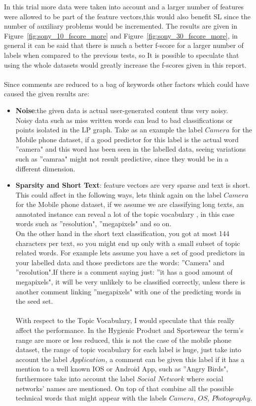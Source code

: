 \documentclass[4pt,a4paper,twocolumn]{article}
\begin{document}
In this trial more data were taken into account and a larger number of features were allowed to be part of the feature vectors,this would also benefit SL since the number of auxiliary problems would be incremented.
The results are given in Figure~\ref{fig:sony_10_fscore_more} and Figure~\ref{fig:sony_30_fscore_more}, in general it can be said that there is much a better f-score for a larger number of labels when compared to the previous tests, so It is possible to speculate that using the whole datasets would greatly increase the f-scores given in this report.\\
\\

Since comments are reduced to a bag of keywords other factors which could have caused the given results are:
\begin{itemize}
\item \textbf{Noise}:the given data is actual user-generated content thus very noisy.\\
Noisy data such as miss written words can lead to bad classifications or points isolated in the LP graph. Take as an example the label $Camera$ for the Mobile phone dataset, if a good predictor for this label is the actual word ''camera" and this word has been seen in the labelled data, seeing variations such as ''camraa" might not result predictive, since they would be in a different dimension.

\item \textbf{Sparsity and Short Text}: feature vectors are very sparse and text is short. This could affect in the following ways, lets think again on the label $Camera$ for the Mobile  phone dataset, if we assume we are classifying long texts, an annotated instance can reveal a lot of the topic vocabulary , in this case words such as ''resolution", ''megapixels" and so on.\\
On the other hand in the short text classification, you got at most 144 characters per text, so you might end up only with a small subset of topic related words.
For example lets assume you have a set of good predictors in your labelled data and those predictors are the words: ''Camera" and ''resolution".If there is a comment saying just: ''it has a good amount of megapixels", it will be very unlikely to be classified correctly, unless there is another comment linking ''megapixels" with one of the predicting words in the seed set.\\
\\
With respect to the Topic Vocabulary, I would speculate that this really affect the performance. In the Hygienic Product and  Sportswear the term's range are more or less reduced, this is not the case of the mobile phone dataset, the range of topic vocabulary for each label is huge, just take into account the label $Application$, a comment can be given this label if it has a mention to a well known IOS or Android App, such as ''Angry Birds", furthermore take into account the label $Social$ $Network$ where social networks' names are mentioned. On top of that combine all the possible technical words that might appear with the labels $Camera$, $OS$, $Photography$.

\end{itemize} 
\end{document}

